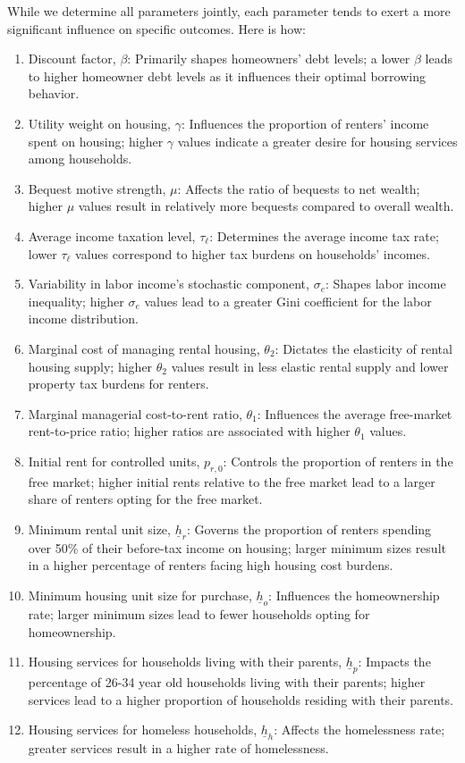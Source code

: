 \documentclass[parskip=full]{article}
\begin{document}
While we determine all parameters jointly, each parameter tends to exert a more significant influence on specific outcomes. Here is how:
\begin{enumerate}
    \item Discount factor, $\beta$: Primarily shapes homeowners' debt levels; a lower $\beta$ leads to higher homeowner debt levels as it influences their optimal borrowing behavior.
    \item Utility weight on housing, $\gamma$: Influences the proportion of renters' income spent on housing; higher $\gamma$ values indicate a greater desire for housing services among households.
    \item Bequest motive strength, $\mu$: Affects the ratio of bequests to net wealth; higher $\mu$ values result in relatively more bequests compared to overall wealth.
    \item Average income taxation level, $\tau_{\ell}$: Determines the average income tax rate; lower $\tau_{\ell}$ values correspond to higher tax burdens on households' incomes.
    \item Variability in labor income's stochastic component, $\sigma_{e}$: Shapes labor income inequality; higher $\sigma_{e}$ values lead to a greater Gini coefficient for the labor income distribution.
    \item Marginal cost of managing rental housing, $\theta_{2}$: Dictates the elasticity of rental housing supply; higher $\theta_{2}$ values result in less elastic rental supply and lower property tax burdens for renters.
    \item Marginal managerial cost-to-rent ratio, $\theta_{1}$: Influences the average free-market rent-to-price ratio; higher ratios are associated with higher $\theta_{1}$ values.
    \item Initial rent for controlled units, $p_{r,0}$: Controls the proportion of renters in the free market; higher initial rents relative to the free market lead to a larger share of renters opting for the free market.
    \item Minimum rental unit size, $\underline{h}_{r}$: Governs the proportion of renters spending over 50\% of their before-tax income on housing; larger minimum sizes result in a higher percentage of renters facing high housing cost burdens.
    \item Minimum housing unit size for purchase, $\underline{h}_{o}$: Influences the homeownership rate; larger minimum sizes lead to fewer households opting for homeownership.
    \item Housing services for households living with their parents, $\underline{h}_{p}$: Impacts the percentage of 26-34 year old households living with their parents; higher services lead to a higher proportion of households residing with their parents.
    \item Housing services for homeless households, $\underline{h}_{h}$: Affects the homelessness rate; greater services result in a higher rate of homelessness.
\end{enumerate}
\end{document}
